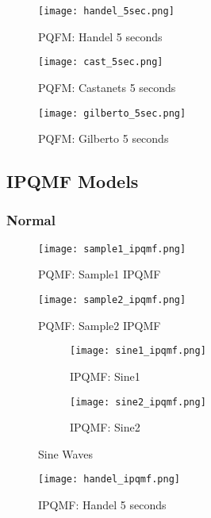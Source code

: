 \documentclass{article} %
\begin{document}
\begin{figure}[H]
\centering
\texttt{[image: handel\_5sec.png]}
\caption{PQFM: Handel 5 seconds}
\end{figure}

\begin{figure}[H]
\centering
\texttt{[image: cast\_5sec.png]}
\caption{PQFM: Castanets 5 seconds}
\end{figure}


\begin{figure}[H]
\centering
\texttt{[image: gilberto\_5sec.png]}
\caption{PQFM: Gilberto 5 seconds}
\end{figure}



\subsection{IPQMF Models}
\subsubsection{Normal}

\begin{figure}[H]
\centering
\texttt{[image: sample1\_ipqmf.png]}
\caption{PQMF: Sample1 IPQMF}
\end{figure}
\begin{figure}[H]
\centering
\texttt{[image: sample2\_ipqmf.png]}
\caption{PQMF: Sample2 IPQMF}
\end{figure}


\begin{figure}[H]

\begin{subfigure}{0.5\textwidth}
\centering
\texttt{[image: sine1\_ipqmf.png]}
\caption{IPQMF: Sine1}
\end{subfigure}
\begin{subfigure}{0.5\textwidth}
\centering
\texttt{[image: sine2\_ipqmf.png]}
\caption{IPQMF: Sine2}
\end{subfigure}
\caption{Sine Waves}
\end{figure}
 

\begin{figure}[H]
\centering
\texttt{[image: handel\_ipqmf.png]}
\caption{IPQMF: Handel 5 seconds}
\end{figure}
\end{document}
